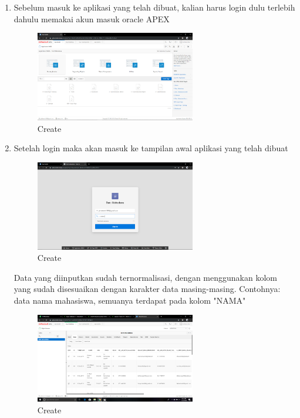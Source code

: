 \documentclass{article}
\begin{document}
\begin{enumerate}
    \item Sebelum masuk ke aplikasi yang telah dibuat, kalian harus login dulu terlebih dahulu memakai akun masuk oracle APEX
    \begin{figure}[h]
	\centering
	\includegraphics[width=7cm]{Figure/RA.png}
	\caption{Create}
	\label{fig:gambar}
	\end{figure}
    
    \item Setelah login maka akan masuk ke tampilan awal aplikasi yang telah dibuat
     \begin{figure}[h]
	\centering
	\includegraphics[width=7cm]{Figure/LRA.png}
	\caption{Create}
	\label{fig:gambar}
	\end{figure}
	
Data yang diinputkan sudah ternormalisasi, dengan menggunakan kolom yang sudah  disesuaikan dengan karakter data masing-masing. Contohnya: data nama mahasiswa, semuanya terdapat pada kolom "NAMA"
     \begin{figure}[h]
	\centering
	\includegraphics[width=7cm]{Figure/Norm.png}
	\caption{Create}
	\label{fig:gambar}
	\end{figure}

	
\end{enumerate}
\end{document}
